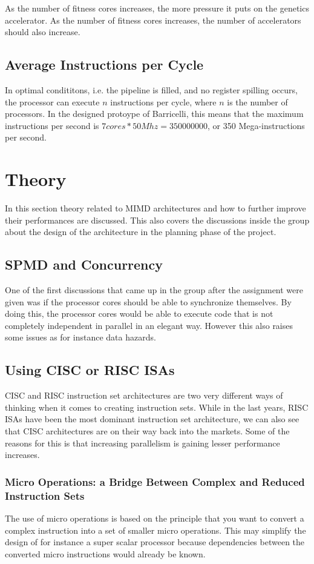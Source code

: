 As the number of fitness cores increases, the more pressure it puts on the genetics accelerator.
As the number of fitness cores increases, the number of accelerators should also increase.

\subsection{Average Instructions per Cycle}

In optimal condititons, i.e.
the pipeline is filled, and no register spilling occurs, the processor can execute $ n $ instructions per cycle, where $ n $ is the number of processors.
In the designed protoype of Barricelli, this means that the maximum instructions per second is $ 7 cores * 50Mhz = 350 000 000 $, or 350 Mega-instructions per second.

\section{Theory}
In this section theory related to MIMD architectures and how to further improve their performances are discussed.
This also covers the discussions inside the group about the design of the architecture in the planning phase of the project.
\subsection{SPMD and Concurrency}
One of the first discussions that came up in the group after the assignment were given was if the processor cores should
be able to synchronize themselves.
By doing this, the processor cores would be able to execute code that is not completely independent in parallel in an elegant way.
However this also raises some issues as for instance data hazards.


\subsection{Using CISC or RISC ISAs}
CISC and RISC instruction set architectures are two very different ways of thinking when it comes to creating instruction sets.
While in the last years, RISC ISAs have been the most dominant instruction set architecture, we can also see that CISC architectures
are on their way back into the markets.
Some of the reasons for this is that increasing parallelism is gaining lesser performance increases.

\subsubsection{Micro Operations: a Bridge Between Complex and Reduced Instruction Sets}
The use of micro operations is based on the principle that you want to convert a complex instruction into a set of smaller micro operations.
This
may simplify the design of for instance a super scalar processor because dependencies between the converted micro instructions would already be known.


